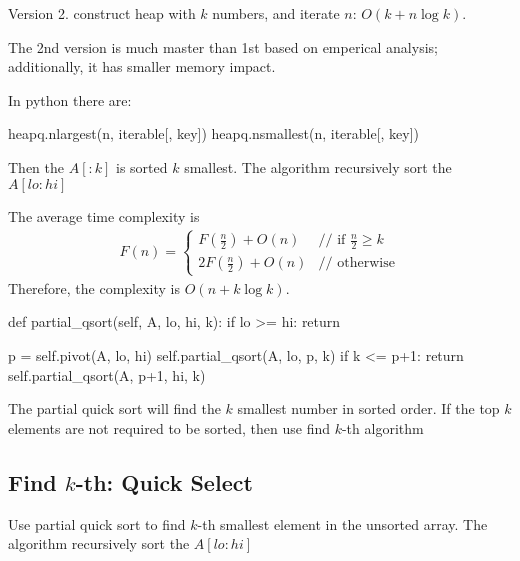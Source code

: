 Version 2. construct heap with $k$ numbers, and iterate $n$: $O(k+n\log k)$. 

The 2nd version is much master than 1st based on emperical analysis; additionally, it has smaller memory impact. 

In python there are:
\begin{python}
heapq.nlargest(n, iterable[, key])
heapq.nsmallest(n, iterable[, key])
\end{python}


  Then the $A[:k]$ is sorted $k$ smallest. The algorithm recursively sort the $A[lo:hi]$

The average time complexity is
\begin{eqnarray*}
F(n) = \left\{ \begin{array}{rl}
  F(\frac{n}{2})+O(n) &\mbox{// if $\frac{n}{2} \geq k$} \\
  2F(\frac{n}{2})+O(n) &\mbox{// otherwise}
       \end{array} \right.
\end{eqnarray*}
Therefore, the complexity is $O(n+k \log k)$.
\begin{python}
def partial_qsort(self, A, lo, hi, k):
    if lo >= hi: return

    p = self.pivot(A, lo, hi)
    self.partial_qsort(A, lo, p, k)
    if k <= p+1: return
    self.partial_qsort(A, p+1, hi, k)
\end{python}
The partial quick sort will find the $k$ smallest number in sorted order. If the top $k$ elements are not required to be sorted, then use find $k$-th algorithm 

\subsection{Find $k$-th: Quick Select}
Use partial quick sort to find $k$-th smallest element in the unsorted array. The algorithm recursively sort the $A[lo:hi]$

